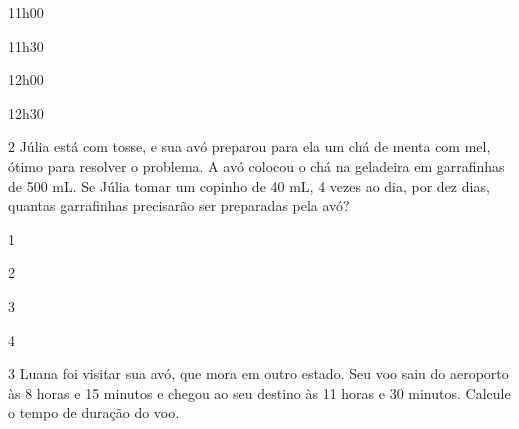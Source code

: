 \begin{escolha}
\begin{multicols}{2}

\item 11h00

\item 11h30
\end{multicols}


\begin{multicols}{2}

\item 12h00

\item 12h30
\end{multicols}
\end{escolha}


\num{2} Júlia está com tosse, e sua avó preparou para ela um chá de menta com mel, ótimo para resolver o problema. A avó colocou o chá na geladeira em garrafinhas de 500 mL. Se Júlia tomar um copinho de 40 mL, 4 vezes ao dia, por dez dias, quantas garrafinhas precisarão ser preparadas pela avó?

\begin{escolha}
\begin{multicols}{2}

\item 1

\item 2
\end{multicols}


\begin{multicols}{2}

\item 3

\item 4
\end{multicols}
\end{escolha}


\num{3} Luana foi visitar sua avó, que mora em outro estado. Seu voo
saiu do aeroporto às 8 horas e 15 minutos e chegou ao seu destino às 11
horas e 30 minutos. Calcule o tempo de duração do voo.

